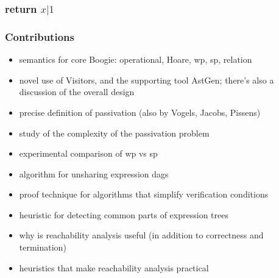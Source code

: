 \documentclass{beamer}
\newcommand{\limp}{\Rightarrow}
\begin{document}
\begin{frame}
  \frametitle{\textbf{return} $x|1$}
\begin{center}
\end{center}
\end{frame}

\begin{frame}
  \frametitle{Contributions}
  \begin{itemize}
  \item semantics for core Boogie: operational, Hoare, wp, sp, relation
  \item novel use of Visitors, and the supporting tool AstGen; there's
    also a discussion of the overall design
  \item precise definition of passivation (also by Vogels, Jacobs, Pissens)
  \item study of the complexity of the passivation problem
  \item experimental comparison of wp vs sp
  \item algorithm for unsharing expression dags
  \item proof technique for algorithms that simplify verification conditions
  \item heuristic for detecting common parts of expression trees
  \item why is reachability analysis useful (in addition to correctness
    and termination)
  \item heuristics that make reachability analysis practical 
  \end{itemize}
\end{frame}
\end{document}

